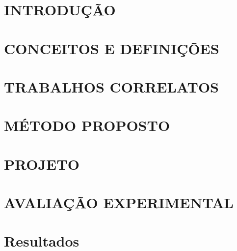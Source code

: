\documentclass[
	12pt,				%
    oneside,			%
	a4paper,			%
	chapter=TITLE,		%
	english,			%
	brazil				%
	]{abntex2}
\begin{document}
\chapter{INTRODUÇÃO}


\chapter{CONCEITOS E DEFINIÇÕES}


\chapter{TRABALHOS CORRELATOS}



\chapter{MÉTODO PROPOSTO}


\chapter{PROJETO}


\chapter{AVALIAÇÃO EXPERIMENTAL}



\chapter{Resultados}

\end{document}
